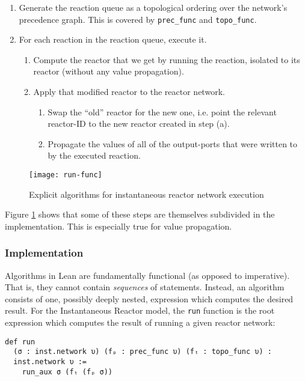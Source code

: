 \begin{enumerate}
  \item Generate the reaction queue as a topological ordering over the network's precedence graph.
  This is covered by \lstinline{prec_func} and \lstinline{topo_func}.
  \item For each reaction in the reaction queue, execute it.
  \begin{enumerate}
    \item Compute the reactor that we get by running the reaction, isolated to its reactor (without any value propagation).
    \item Apply that modified reactor to the reactor network.
    \begin{enumerate}
      \item Swap the ``old'' reactor for the new one, i.e. point the relevant reactor-ID to the new reactor created in step (a).
      \item Propagate the values of all of the output-ports that were written to by the executed reaction.
    \end{enumerate}
  \end{enumerate}
\end{enumerate}

\begin{figure}[h]
\centering
\texttt{[image: run-func]}
\caption{Explicit algorithms for instantaneous reactor network execution}
\label{fig:exec-plan}
\end{figure}

\noindent Figure \ref{fig:exec-plan} shows that some of these steps are themselves subdivided in the implementation.
This is especially true for value propagation.

\subsubsection{Implementation}

Algorithms in Lean are fundamentally functional (as opposed to imperative).
That is, they cannot contain \emph{sequences} of statements.
Instead, an algorithm consists of one, possibly deeply nested, expression which computes the desired result.
For the Instantaneous Reactor model, the \lstinline{run} function is the root expression which computes the result of running a given reactor network:

\begin{lstlisting}
def run 
  (σ : inst.network υ) (fₚ : prec_func υ) (fₜ : topo_func υ) : 
  inst.network υ :=
    run_aux σ (fₜ (fₚ σ))
\end{lstlisting}

